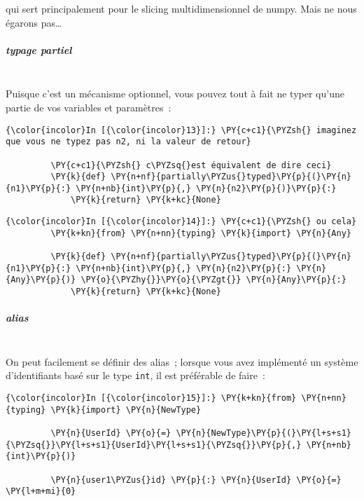     qui sert principalement pour le slicing multidimensionnel de numpy. Mais
ne nous égarons pas\ldots{}

    \hypertarget{typage-partiel}{%
\subparagraph{typage partiel\\\\}\label{typage-partiel}}

    Puisque c'est un mécanisme optionnel, vous pouvez tout à fait ne typer
qu'une partie de vos variables et paramètres~:

    \begin{Verbatim}[commandchars=\\\{\}]
{\color{incolor}In [{\color{incolor}13}]:} \PY{c+c1}{\PYZsh{} imaginez que vous ne typez pas n2, ni la valeur de retour}
         
         \PY{c+c1}{\PYZsh{} c\PYZsq{}est équivalent de dire ceci}
         \PY{k}{def} \PY{n+nf}{partially\PYZus{}typed}\PY{p}{(}\PY{n}{n1}\PY{p}{:} \PY{n+nb}{int}\PY{p}{,} \PY{n}{n2}\PY{p}{)}\PY{p}{:}
             \PY{k}{return} \PY{k+kc}{None}
\end{Verbatim}


    \begin{Verbatim}[commandchars=\\\{\}]
{\color{incolor}In [{\color{incolor}14}]:} \PY{c+c1}{\PYZsh{} ou cela}
         \PY{k+kn}{from} \PY{n+nn}{typing} \PY{k}{import} \PY{n}{Any}
         
         \PY{k}{def} \PY{n+nf}{partially\PYZus{}typed}\PY{p}{(}\PY{n}{n1}\PY{p}{:} \PY{n+nb}{int}\PY{p}{,} \PY{n}{n2}\PY{p}{:} \PY{n}{Any}\PY{p}{)} \PY{o}{\PYZhy{}}\PY{o}{\PYZgt{}} \PY{n}{Any}\PY{p}{:}
             \PY{k}{return} \PY{k+kc}{None}
\end{Verbatim}


    \hypertarget{alias}{%
\subparagraph{alias\\\\}\label{alias}}

    On peut facilement se définir des alias~; lorsque vous avez implémenté
un système d'identifiants basé sur le type \texttt{int}, il est
préférable de faire~:

    \begin{Verbatim}[commandchars=\\\{\}]
{\color{incolor}In [{\color{incolor}15}]:} \PY{k+kn}{from} \PY{n+nn}{typing} \PY{k}{import} \PY{n}{NewType}
         
         \PY{n}{UserId} \PY{o}{=} \PY{n}{NewType}\PY{p}{(}\PY{l+s+s1}{\PYZsq{}}\PY{l+s+s1}{UserId}\PY{l+s+s1}{\PYZsq{}}\PY{p}{,} \PY{n+nb}{int}\PY{p}{)}
         
         \PY{n}{user1\PYZus{}id} \PY{p}{:} \PY{n}{UserId} \PY{o}{=} \PY{l+m+mi}{0}
\end{Verbatim}


